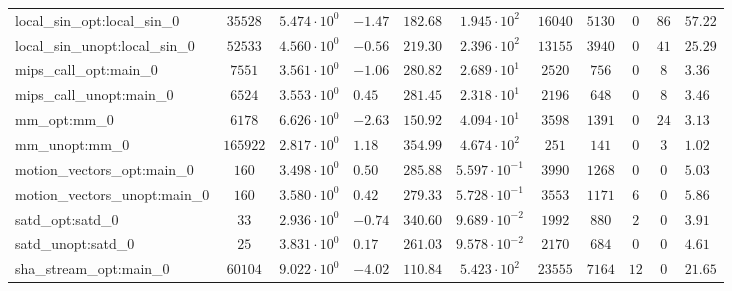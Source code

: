 \begin{tabular}{|l|c|HHc|c|c|c|c|cH|}
local\_sin\_opt:local\_sin\_0                   & $ 35528    $ & $ 5.474 \cdot 10^{0} $ & $ -1.47 $ & $ 182.68 $ & $ 1.945 \cdot 10^{2}  $ & $ 16040  $ & $ 5130  $ & $ 0   $ & $ 86  $ & $ 57.22   $ \\
local\_sin\_unopt:local\_sin\_0                 & $ 52533    $ & $ 4.560 \cdot 10^{0} $ & $ -0.56 $ & $ 219.30 $ & $ 2.396 \cdot 10^{2}  $ & $ 13155  $ & $ 3940  $ & $ 0   $ & $ 41  $ & $ 25.29   $ \\
mips\_call\_opt:main\_0                         & $ 7551     $ & $ 3.561 \cdot 10^{0} $ & $ -1.06 $ & $ 280.82 $ & $ 2.689 \cdot 10^{1}  $ & $ 2520   $ & $ 756   $ & $ 0   $ & $ 8   $ & $ 3.36    $ \\
mips\_call\_unopt:main\_0                       & $ 6524     $ & $ 3.553 \cdot 10^{0} $ & $ 0.45  $ & $ 281.45 $ & $ 2.318 \cdot 10^{1}  $ & $ 2196   $ & $ 648   $ & $ 0   $ & $ 8   $ & $ 3.46    $ \\
mm\_opt:mm\_0                                   & $ 6178     $ & $ 6.626 \cdot 10^{0} $ & $ -2.63 $ & $ 150.92 $ & $ 4.094 \cdot 10^{1}  $ & $ 3598   $ & $ 1391  $ & $ 0   $ & $ 24  $ & $ 3.13    $ \\
mm\_unopt:mm\_0                                 & $ 165922   $ & $ 2.817 \cdot 10^{0} $ & $ 1.18  $ & $ 354.99 $ & $ 4.674 \cdot 10^{2}  $ & $ 251    $ & $ 141   $ & $ 0   $ & $ 3   $ & $ 1.02    $ \\
motion\_vectors\_opt:main\_0                    & $ 160      $ & $ 3.498 \cdot 10^{0} $ & $ 0.50  $ & $ 285.88 $ & $ 5.597 \cdot 10^{-1} $ & $ 3990   $ & $ 1268  $ & $ 0   $ & $ 0   $ & $ 5.03    $ \\
motion\_vectors\_unopt:main\_0                  & $ 160      $ & $ 3.580 \cdot 10^{0} $ & $ 0.42  $ & $ 279.33 $ & $ 5.728 \cdot 10^{-1} $ & $ 3553   $ & $ 1171  $ & $ 6   $ & $ 0   $ & $ 5.86    $ \\
satd\_opt:satd\_0                               & $ 33       $ & $ 2.936 \cdot 10^{0} $ & $ -0.74 $ & $ 340.60 $ & $ 9.689 \cdot 10^{-2} $ & $ 1992   $ & $ 880   $ & $ 2   $ & $ 0   $ & $ 3.91    $ \\
satd\_unopt:satd\_0                             & $ 25       $ & $ 3.831 \cdot 10^{0} $ & $ 0.17  $ & $ 261.03 $ & $ 9.578 \cdot 10^{-2} $ & $ 2170   $ & $ 684   $ & $ 0   $ & $ 0   $ & $ 4.61    $ \\
sha\_stream\_opt:main\_0                        & $ 60104    $ & $ 9.022 \cdot 10^{0} $ & $ -4.02 $ & $ 110.84 $ & $ 5.423 \cdot 10^{2}  $ & $ 23555  $ & $ 7164  $ & $ 12  $ & $ 0   $ & $ 21.65   $ \\

\end{tabular}
